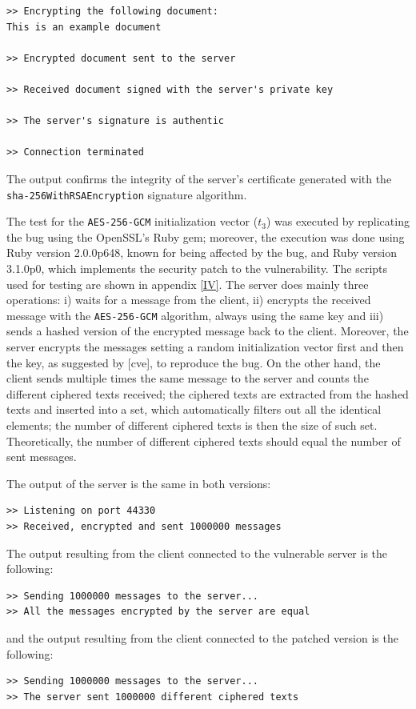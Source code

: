 \begin{verbatim}
>> Encrypting the following document:
This is an example document

>> Encrypted document sent to the server

>> Received document signed with the server's private key

>> The server's signature is authentic

>> Connection terminated
\end{verbatim}

The output confirms the integrity of the server's certificate generated with the \texttt{sha-256WithRSAEncryption} signature algorithm.

The test for the \texttt{AES-256-GCM} initialization vector (\(t_3\)) was executed by replicating the bug using the OpenSSL's Ruby gem; moreover, the execution was done using Ruby version 2.0.0p648, known for being affected by the bug, and Ruby version 3.1.0p0, which implements the security patch to the vulnerability. The scripts used for testing are shown in appendix \ref{IV}. The server does mainly three operations: i) waits for a message from the client, ii) encrypts the received message with the \texttt{AES-256-GCM} algorithm, always using the same key and iii) sends a hashed version of the encrypted message back to the client. Moreover, the server encrypts the messages setting a random initialization vector first and then the key, as suggested by [cve], to reproduce the bug. On the other hand, the client sends multiple times the same message to the server and counts the different ciphered texts received; the ciphered texts are extracted from the hashed texts and inserted into a set, which automatically filters out all the identical elements; the number of different ciphered texts is then the size of such set. Theoretically, the number of different ciphered texts should equal the number of sent messages.

The output of the server is the same in both versions:
\begin{verbatim}
>> Listening on port 44330
>> Received, encrypted and sent 1000000 messages
\end{verbatim}

The output resulting from the client connected to the vulnerable server is the following:
\begin{verbatim}
>> Sending 1000000 messages to the server...
>> All the messages encrypted by the server are equal
\end{verbatim}

and the output resulting from the client connected to the patched version is the following:
\begin{verbatim}
>> Sending 1000000 messages to the server...
>> The server sent 1000000 different ciphered texts
\end{verbatim}

